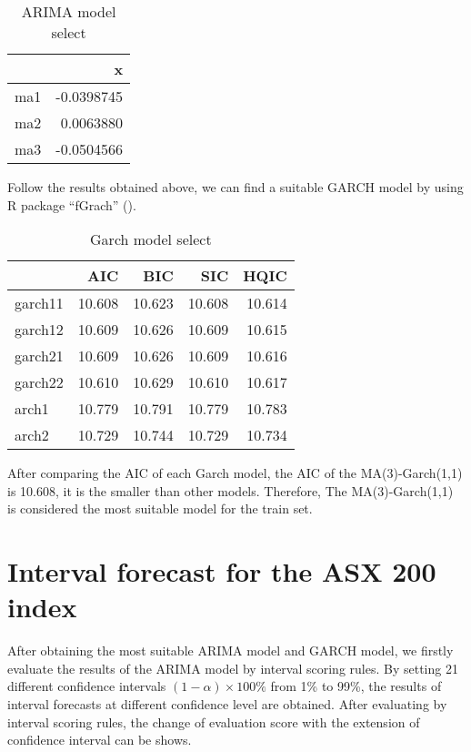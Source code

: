 \documentclass{monashthesis}
\theoremstyle{definition}
\theoremstyle{definition}
\theoremstyle{definition}
\theoremstyle{remark}
\begin{document}
\begin{table}

\caption{\label{tab:modelselect1}ARIMA model select}
\centering
\begin{tabular}[t]{lr}
\toprule
  & x\\
\midrule
ma1 & -0.0398745\\
ma2 & 0.0063880\\
ma3 & -0.0504566\\
\bottomrule
\end{tabular}
\end{table}

Follow the results obtained above, we can find a suitable GARCH model by
using R package ``fGrach'' (\textcite{WH17}).

\begin{table}[!h]

\caption{\label{tab:table1}Garch model select}
\centering
\begin{tabular}[t]{lrrrr}
\toprule
  & AIC & BIC & SIC & HQIC\\
\midrule
garch11 & 10.608 & 10.623 & 10.608 & 10.614\\
garch12 & 10.609 & 10.626 & 10.609 & 10.615\\
garch21 & 10.609 & 10.626 & 10.609 & 10.616\\
garch22 & 10.610 & 10.629 & 10.610 & 10.617\\
arch1 & 10.779 & 10.791 & 10.779 & 10.783\\
arch2 & 10.729 & 10.744 & 10.729 & 10.734\\
\bottomrule
\end{tabular}
\end{table}

After comparing the AIC of each Garch model, the AIC of the
MA(3)-Garch(1,1) is 10.608, it is the smaller than other models.
Therefore, The MA(3)-Garch(1,1) is considered the most suitable model
for the train set.

\section{Interval forecast for the ASX 200
index}\label{interval-forecast-for-the-asx-200-index}

After obtaining the most suitable ARIMA model and GARCH model, we
firstly evaluate the results of the ARIMA model by interval scoring
rules. By setting 21 different confidence intervals
\((1-\alpha)\times100\%\) from 1\% to 99\%, the results of interval
forecasts at different confidence level are obtained. After evaluating
by interval scoring rules, the change of evaluation score with the
extension of confidence interval can be shows.
\end{document}
